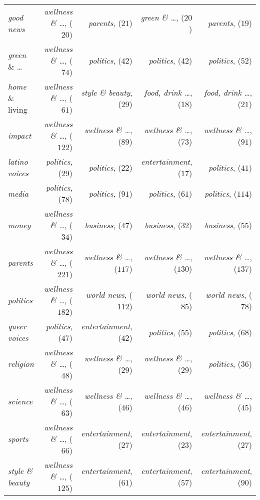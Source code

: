 \documentclass[a4paper,11pt]{article}
\begin{document}
\begin{table}[ht]
\begin{tabular}{|l||rrrr|}
  \textit{good news} & \textit{wellness \& \dots}, ($20$) & \textit{parents}, ($21$) & \textit{green \& \dots}, ($20$) & \textit{parents}, ($19$) \\ 
  \textit{green} \& \dots & \textit{wellness \& \dots}, ($74$) & \textit{politics}, ($42$) & \textit{politics}, ($42$) & \textit{politics}, ($52$) \\ 
  \textit{home} \& living & \textit{wellness \& \dots}, ($61$) & \textit{style \& beauty}, ($29$) & \textit{food, drink \dots}, ($18$) & \textit{food, \textit{drink} \dots}, ($21$) \\ 
  \textit{impact} & \textit{wellness \& \dots}, ($122$) & \textit{wellness \& \dots}, ($89$) & \textit{wellness \& \dots}, ($73$) & \textit{wellness \& \dots}, ($91$) \\ 
  \textit{latino voices} & \textit{politics}, ($29$) & \textit{politics}, ($22$) & \textit{entertainment}, ($17$) & \textit{politics}, ($41$) \\ 
  \textit{media} & \textit{politics}, ($78$) & \textit{politics}, ($91$) & \textit{politics}, ($61$) & \textit{politics}, ($114$) \\ 
  \textit{money} & \textit{wellness \& \dots}, ($34$) & \textit{business}, ($47$) & \textit{business}, ($32$) & \textit{business}, ($55$) \\ 
  \textit{parents} & \textit{wellness \& \dots}, ($221$) & \textit{wellness \& \dots}, ($117$) & \textit{wellness \& \dots}, ($130$) & \textit{wellness \& \dots}, ($137$) \\ 
  \textit{politics} & \textit{wellness \& \dots}, ($182$) & \textit{world news}, ($112$) & \textit{world news}, ($85$) & \textit{world news}, ($78$) \\ 
  \textit{queer voices} & \textit{politics}, ($47$) & \textit{entertainment}, ($42$) & \textit{politics}, ($55$) & \textit{politics}, ($68$) \\ 
  \textit{religion} & \textit{wellness \& \dots}, ($48$) & \textit{wellness \& \dots}, ($29$) & \textit{wellness \& \dots}, ($29$) & \textit{politics}, ($36$) \\ 
  \textit{science} & \textit{wellness \& \dots}, ($63$) & \textit{wellness \& \dots}, ($46$) & \textit{wellness \& \dots}, ($46$) & \textit{wellness \& \dots}, ($45$) \\ 
  \textit{sports} & \textit{wellness \& \dots}, ($66$) & \textit{entertainment}, ($27$) & \textit{entertainment}, ($23$) & \textit{entertainment}, ($27$) \\ 
  \textit{style \& beauty} & \textit{wellness \& \dots}, ($125$) & \textit{entertainment}, ($61$) & \textit{entertainment}, ($57$) & \textit{entertainment}, ($90$) \\ 

\end{tabular}
\end{table}
\end{document}
